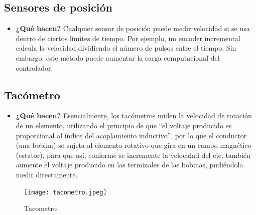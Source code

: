 \subsection*{Sensores de posición}
\begin{itemize}
	\item \textbf{¿Qué hacen?} Cualquier sensor de posición puede medir velocidad si se usa dentro de ciertos límites de tiempo. Por ejemplo, un encoder incremental calcula la velocidad dividiendo el número de pulsos entre el tiempo. Sin embargo, este método puede aumentar la carga computacional del controlador.
	
\end{itemize}

\subsection*{Tacómetro}
\begin{itemize}
	\item \textbf{¿Qué hacen?} Esencialmente, los tacómetros miden la velocidad de rotación de un elemento, utilizando el principio de que “el voltaje producido es proporcional al índice del acoplamiento inductivo”, por lo que el conductor (una bobina) se sujeta al elemento rotativo que gira en un campo magnético (estator), para que así, conforme se incremente la velocidad del eje, también aumente el voltaje producido en las terminales de las bobinas, pudiéndola medir directamente. 	\cite{BFMX_SensoresInternosRobot} 		
\end{itemize}

\begin{figure}[h]
	\centering
	{%
		\texttt{[image: tacometro.jpeg]}%
		\caption{Tacometro}
		\label{fig:tcmtro}
	}
\end{figure}



\vspace{10cm}


